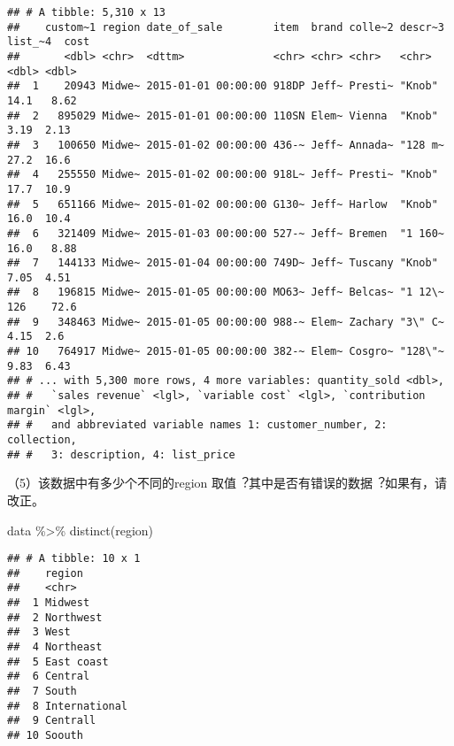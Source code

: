 \documentclass[
]{article}
\newenvironment{Shaded}{\begin{snugshade}}{\end{snugshade}}
\newcommand{\FunctionTok}[1]{\textcolor[rgb]{0.00,0.00,0.00}{#1}}
\newcommand{\NormalTok}[1]{#1}
\newcommand{\OtherTok}[1]{\textcolor[rgb]{0.56,0.35,0.01}{#1}}
\newcommand{\SpecialCharTok}[1]{\textcolor[rgb]{0.00,0.00,0.00}{#1}}
\newcommand{\StringTok}[1]{\textcolor[rgb]{0.31,0.60,0.02}{#1}}
\begin{document}
\begin{verbatim}
## # A tibble: 5,310 x 13
##    custom~1 region date_of_sale        item  brand colle~2 descr~3 list_~4  cost
##       <dbl> <chr>  <dttm>              <chr> <chr> <chr>   <chr>     <dbl> <dbl>
##  1    20943 Midwe~ 2015-01-01 00:00:00 918DP Jeff~ Presti~ "Knob"    14.1   8.62
##  2   895029 Midwe~ 2015-01-01 00:00:00 110SN Elem~ Vienna  "Knob"     3.19  2.13
##  3   100650 Midwe~ 2015-01-02 00:00:00 436-~ Jeff~ Annada~ "128 m~   27.2  16.6 
##  4   255550 Midwe~ 2015-01-02 00:00:00 918L~ Jeff~ Presti~ "Knob"    17.7  10.9 
##  5   651166 Midwe~ 2015-01-02 00:00:00 G130~ Jeff~ Harlow  "Knob"    16.0  10.4 
##  6   321409 Midwe~ 2015-01-03 00:00:00 527-~ Jeff~ Bremen  "1 160~   16.0   8.88
##  7   144133 Midwe~ 2015-01-04 00:00:00 749D~ Jeff~ Tuscany "Knob"     7.05  4.51
##  8   196815 Midwe~ 2015-01-05 00:00:00 MO63~ Jeff~ Belcas~ "1 12\~  126    72.6 
##  9   348463 Midwe~ 2015-01-05 00:00:00 988-~ Elem~ Zachary "3\" C~    4.15  2.6 
## 10   764917 Midwe~ 2015-01-05 00:00:00 382-~ Elem~ Cosgro~ "128\"~    9.83  6.43
## # ... with 5,300 more rows, 4 more variables: quantity_sold <dbl>,
## #   `sales revenue` <lgl>, `variable cost` <lgl>, `contribution margin` <lgl>,
## #   and abbreviated variable names 1: customer_number, 2: collection,
## #   3: description, 4: list_price
\end{verbatim}

（5）该数据中有多少个不同的region
取值︖其中是否有错误的数据︖如果有，请改正。

\begin{Shaded}
\begin{Highlighting}[]
\NormalTok{data }\SpecialCharTok{\%\textgreater{}\%}
  \FunctionTok{distinct}\NormalTok{(region)}
\end{Highlighting}
\end{Shaded}

\begin{verbatim}
## # A tibble: 10 x 1
##    region       
##    <chr>        
##  1 Midwest      
##  2 Northwest    
##  3 West         
##  4 Northeast    
##  5 East coast   
##  6 Central      
##  7 South        
##  8 International
##  9 Centrall     
## 10 Soouth
\end{verbatim}

\begin{Shaded}
\end{Shaded}
\end{document}
